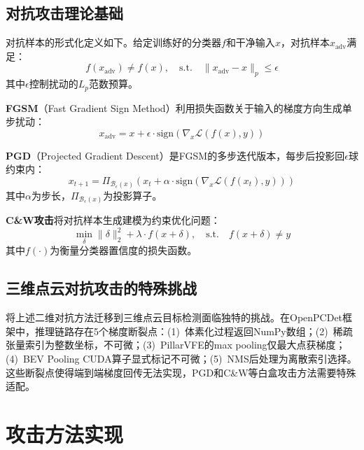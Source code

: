 ﻿\documentclass[12pt,a4paper]{ctexart}
\begin{document}
\subsection{对抗攻击理论基础}

对抗样本的形式化定义如下。给定训练好的分类器$f$和干净输入$x$，对抗样本$x_{\text{adv}}$满足：
\begin{equation}
  f(x_{\text{adv}}) \neq f(x), \quad \text{s.t.} \quad \|x_{\text{adv}} - x\|_p \leq \epsilon
  \label{eq:adv_def}
\end{equation}
其中$\epsilon$控制扰动的$L_p$范数预算。

\textbf{FGSM}（Fast Gradient Sign Method）\cite{goodfellow2015explaining}利用损失函数关于输入的梯度方向生成单步扰动：
\begin{equation}
  x_{\text{adv}} = x + \epsilon \cdot \text{sign}(\nabla_x \mathcal{L}(f(x), y))
  \label{eq:fgsm}
\end{equation}

\textbf{PGD}（Projected Gradient Descent）\cite{madry2018towards}是FGSM的多步迭代版本，每步后投影回$\epsilon$球约束内：
\begin{equation}
  x_{t+1} = \Pi_{\mathcal{B}_\epsilon(x)}\left(x_t + \alpha \cdot \text{sign}(\nabla_x \mathcal{L}(f(x_t), y))\right)
  \label{eq:pgd}
\end{equation}
其中$\alpha$为步长，$\Pi_{\mathcal{B}_\epsilon(x)}$为投影算子。

\textbf{C\&W攻击}\cite{carlini2017towards}将对抗样本生成建模为约束优化问题：
\begin{equation}
  \min_{\delta} \|\delta\|_2^2 + \lambda \cdot f(x + \delta), \quad \text{s.t.} \quad f(x + \delta) \neq y
  \label{eq:cw}
\end{equation}
其中$f(\cdot)$为衡量分类器置信度的损失函数。

\subsection{三维点云对抗攻击的特殊挑战}

将上述二维对抗方法迁移到三维点云目标检测面临独特的挑战。在OpenPCDet框架中，推理链路存在5个梯度断裂点：(1)~体素化过程返回NumPy数组；(2)~稀疏张量索引为整数坐标，不可微；(3)~PillarVFE的max pooling仅最大点获梯度；(4)~BEV Pooling CUDA算子显式标记不可微；(5)~NMS后处理为离散索引选择。这些断裂点使得端到端梯度回传无法实现，PGD和C\&W等白盒攻击方法需要特殊适配。

\section{攻击方法实现}
\end{document}
